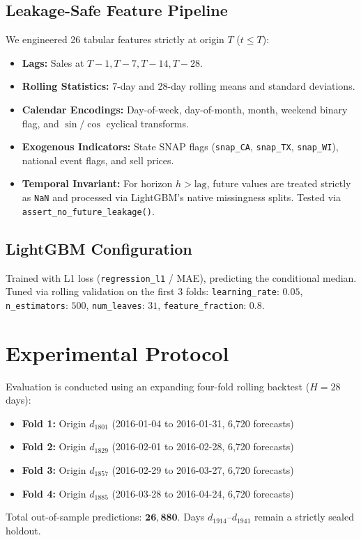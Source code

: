 \documentclass[11pt,a4paper]{article}
\begin{document}
\subsection{Leakage-Safe Feature Pipeline}
We engineered 26 tabular features strictly at origin $T$ ($t \le T$):
\begin{itemize}
    \item \textbf{Lags:} Sales at $T-1, T-7, T-14, T-28$.
    \item \textbf{Rolling Statistics:} 7-day and 28-day rolling means and standard deviations.
    \item \textbf{Calendar Encodings:} Day-of-week, day-of-month, month, weekend binary flag, and $\sin/\cos$ cyclical transforms.
    \item \textbf{Exogenous Indicators:} State SNAP flags (\texttt{snap\_CA}, \texttt{snap\_TX}, \texttt{snap\_WI}), national event flags, and sell prices.
    \item \textbf{Temporal Invariant:} For horizon $h > \text{lag}$, future values are treated strictly as \texttt{NaN} and processed via LightGBM's native missingness splits. Tested via \texttt{assert\_no\_future\_leakage()}.
\end{itemize}

\subsection{LightGBM Configuration}
Trained with L1 loss (\texttt{regression\_l1} / MAE), predicting the conditional median. Tuned via rolling validation on the first 3 folds: \texttt{learning\_rate}: $0.05$, \texttt{n\_estimators}: $500$, \texttt{num\_leaves}: $31$, \texttt{feature\_fraction}: $0.8$.

\section{Experimental Protocol}
Evaluation is conducted using an expanding four-fold rolling backtest ($H = 28$ days):
\begin{itemize}
    \item \textbf{Fold 1:} Origin $d_{1801}$ (2016-01-04 to 2016-01-31, 6,720 forecasts)
    \item \textbf{Fold 2:} Origin $d_{1829}$ (2016-02-01 to 2016-02-28, 6,720 forecasts)
    \item \textbf{Fold 3:} Origin $d_{1857}$ (2016-02-29 to 2016-03-27, 6,720 forecasts)
    \item \textbf{Fold 4:} Origin $d_{1885}$ (2016-03-28 to 2016-04-24, 6,720 forecasts)
\end{itemize}
Total out-of-sample predictions: $\mathbf{26,880}$. Days $d_{1914}\text{--}d_{1941}$ remain a strictly sealed holdout.
\end{document}
